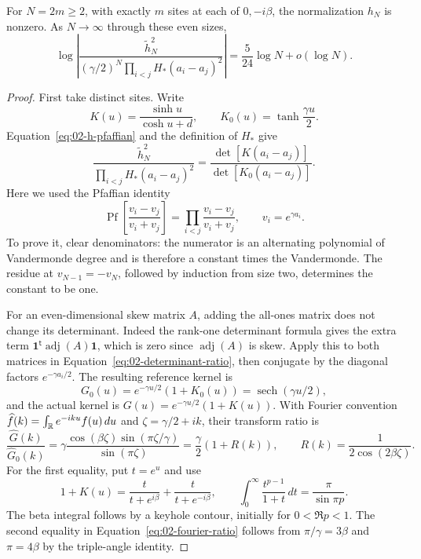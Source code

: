 \begin{theorem}\label{thm:02-denominator}\label{E:balanced-denominator}
For $N=2m\ge2$, with exactly $m$ sites at each of $0,-i\beta$, the
normalization $h_N$ is nonzero. As $N\to\infty$ through these even
sizes,
\begin{equation}\label{eq:02-denominator}
 \log\left|
 \frac{\widetilde h_N^2}
      {(\gamma/2)^N\prod_{i<j}H_*(a_i-a_j)^2}
 \right|
 =\frac5{24}\log N+o(\log N).
\end{equation}
\end{theorem}
\begin{proof}
First take distinct sites. Write
\[
 K(u)=\frac{\sinh u}{\cosh u+d},\qquad
 K_0(u)=\tanh\frac{\gamma u}{2}.
\]
Equation~\eqref{eq:02-h-pfaffian} and the definition of $H_*$ give
\begin{equation}\label{eq:02-determinant-ratio}
 \frac{\widetilde h_N^2}{\prod_{i<j}H_*(a_i-a_j)^2}
 =\frac{\det[K(a_i-a_j)]}{\det[K_0(a_i-a_j)]}.
\end{equation}
Here we used the Pfaffian identity
\[
 \operatorname{Pf}\left[\frac{v_i-v_j}{v_i+v_j}\right]
       =\prod_{i<j}\frac{v_i-v_j}{v_i+v_j},\qquad v_i=e^{\gamma a_i}.
\]
To prove it, clear denominators: the numerator is an alternating
polynomial of Vandermonde degree and is therefore a constant times
the Vandermonde. The residue at $v_{N-1}=-v_N$, followed by induction
from size two, determines the constant to be one.

For an even-dimensional skew matrix $A$, adding the all-ones matrix
does not change its determinant. Indeed the rank-one determinant
formula gives the extra term $\boldsymbol1^{\mathsf t}
\operatorname{adj}(A)\boldsymbol1$, which is zero since
$\operatorname{adj}(A)$ is skew. Apply this to both matrices in
Equation~\eqref{eq:02-determinant-ratio}, then conjugate by the
diagonal factors $e^{-\gamma a_i/2}$. The resulting reference kernel
is
\[
 G_0(u)=e^{-\gamma u/2}(1+K_0(u))
       =\operatorname{sech}(\gamma u/2),
\]
and the actual kernel is $G(u)=e^{-\gamma u/2}(1+K(u))$.
With Fourier convention $\widehat f(k)=\int_\mathbb R e^{-iku}f(u)\,du$
and $\zeta=\gamma/2+ik$, their transform ratio is
\begin{equation}\label{eq:02-fourier-ratio}
 \frac{\widehat G(k)}{\widehat G_0(k)}
 =\gamma\frac{\cos(\beta\zeta)\sin(\pi\zeta/\gamma)}
                    {\sin(\pi\zeta)}
 =\frac\gamma2(1+R(k)),\qquad
 R(k)=\frac1{2\cos(2\beta\zeta)}.
\end{equation}
For the first equality, put $t=e^u$ and use
\[
 1+K(u)=\frac{t}{t+e^{i\beta}}+\frac{t}{t+e^{-i\beta}},\qquad
 \int_0^\infty\frac{t^{p-1}}{1+t}\,dt=\frac\pi{\sin\pi p}.
\]
The beta integral follows by a keyhole contour, initially for
$0<\Re p<1$. The second equality in
Equation~\eqref{eq:02-fourier-ratio} follows from
$\pi/\gamma=3\beta$ and $\pi=4\beta$ by the triple-angle identity.


\end{proof}
